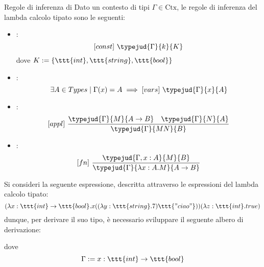 \documentclass[a4paper, 12pt]{report}
\begin{document}
    \begin{framedprop}[label={sys f1 rules}]{Regole di inferenza di }
        Dato un contesto di tipi $\Gamma \in \mathrm{Ctx}$, le regole di inferenza del lambda calcolo tipato sono le seguenti:

        \begin{itemize}
            \item {}: $$[const] \ \typejud{\Gamma}{k}{K}$$ dove $K := \{\ttt{int}, \ttt{string}, \ttt{bool}\}$
            \item {}: $$\exists A \in Types \mid \Gamma(x) = A \implies [vars] \ \typejud{\Gamma}{x}{A}$$
            \item {}: $$[appl] \ \dfrac{\typejud{\Gamma}{M}{A \to B} \quad \typejud{\Gamma}{N}{A}}{\typejud{\Gamma}{MN}{B}}$$
            \item {}: $$[fn] \ \dfrac{\typejud{\Gamma,x:A}{M}{B}}{\typejud{\Gamma}{\lambda x: A.M}{A \to B}}$$
        \end{itemize}
    \end{framedprop}

    \begin{example}
        Si consideri la seguente espressione, descritta attraverso le espressioni del lambda calcolo tipato: $$(\lambda x:\ttt{int}\to \ttt{bool}.x((\lambda y:\ttt{string}.7)\ttt{"ciao"}))(\lambda z: \ttt{int}.true)$$ dunque, per derivare il suo tipo, è necessario sviluppare il seguente albero di derivazione: 

        dove $$\Gamma := x: \ttt{int} \to \ttt{bool}$$
    \end{example}
\end{document}
